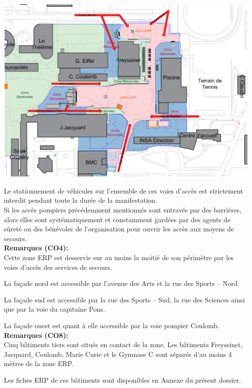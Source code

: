 \documentclass[hidelinks, paper=a4, fontsize=13pt]{report}
\begin{document}
\begin{center}
	\includegraphics[width=.8\textwidth,keepaspectratio]{Exports/Plan_24h_44eme-Acces_Pompiers}
\end{center}

Le stationnement de véhicules sur l’ensemble de ces voies d’accès est strictement interdit pendant toute la durée de la manifestation. \\

Si les accès pompiers précédemment mentionnés sont entravés par des barrières, alors elles sont systématiquement et constamment gardées par des agents de sûreté ou des bénévoles de l’organisation pour ouvrir les accès aux moyens de secours.\\

\textbf{Remarques (CO4): }\\
Cette zone ERP est desservie sur au moins la moitié de son périmètre par les voies d’accès des services de secours. 

La façade nord est accessible par l’avenue des Arts et la rue des Sports – Nord. 

La façade sud est accessible par la rue des Sports – Sud, la rue des Sciences ainsi que par la voie du capitaine Pons. 

La façade ouest est quant à elle accessible par la voie pompier Coulomb.\\


\textbf{Remarques (CO8): }\\
Cinq bâtiments tiers sont situés en contact de la zone. Les bâtiments Freyssinet, Jacquard, Coulomb, Marie Curie et le Gymnase C sont séparés d’au moins 4 mètres de la zone ERP. 

Les fiches ERP de ces bâtiments sont disponibles en Annexe du présent dossier. 
\end{document}
